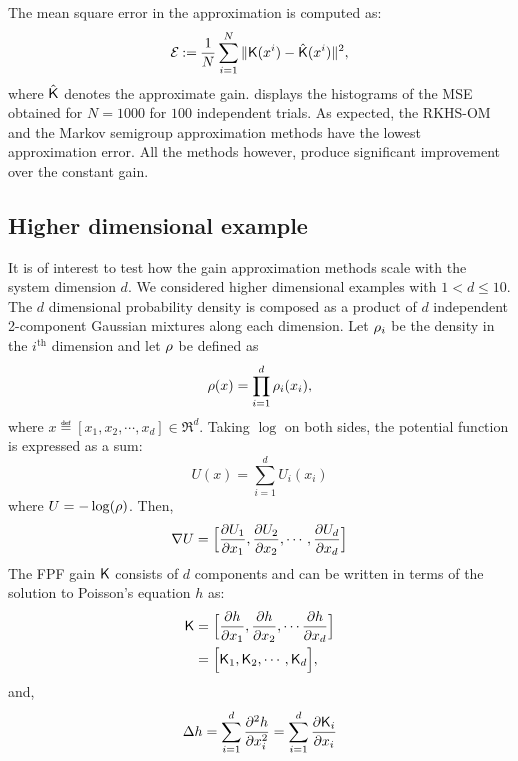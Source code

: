 The mean square error in the approximation is computed as:
\begin{equation}
\mathcal{E} \eqdef \frac{1}{N} \sum_{i=1}^N \|\kFPF(x^i)  - \hat{\kFPF}(x^i) \|^2,
\label{e:gain_mse}
\end{equation}
where $\hat{\text{\sf K}}$ denotes the approximate gain.  displays the histograms of the MSE obtained for $N=1000$ for $100$ independent trials. As expected, the RKHS-OM and the Markov semigroup approximation methods have the lowest approximation error. All the methods however, produce significant improvement over the constant gain. 

\subsection*{Higher dimensional example}
It is of interest to test how the gain approximation methods scale with the system dimension $d$. We considered higher dimensional examples with $1<d \leq 10$.  
The $d$ dimensional probability density is composed as a product of $d$ independent 2-component Gaussian mixtures along each dimension. Let $\rho_i$ be the density in the $i^{\text{th}}$ dimension and let $\rho$ be defined as 
\begin{equation}
\rho(x) = \prod_{i=1}^d \rho_i(x_i),
\end{equation}
where $x \eqdef [x_1, x_2, \cdots, x_d] \in \Re^d$. 
Taking $\log$ on both sides, the potential function is expressed as a sum:
\begin{equation}
U(x) = \sum_{i=1}^d U_i(x_i)
\end{equation}
where $U = -\log(\rho)$.
Then,
\begin{equation}
\nabla U = \Bigl[ \frac{\partial U_1}{\partial x_1}, \frac{\partial U_2}{\partial x_2}, \cdots , \frac{\partial U_d}{\partial x_d} \Bigr]
\end{equation}
The FPF gain $\text{\sf K}$ consists of $d$ components and can be written in terms of the solution to Poisson's equation $h$ as: 
\begin{equation}
\begin{aligned}
\text{\sf K} &= \Bigl[\frac{\partial h}{\partial x_1}, \frac{\partial h}{\partial x_2}, \cdots \frac{\partial h}{\partial x_d}\Bigr] \\
& = \Bigl[ \text{\sf K}_1, \text{\sf K}_2, \cdots, \text{\sf K}_d\Bigr],
\end{aligned}
\end{equation}
and, 
\begin{equation}
\Delta h = \sum_{i=1}^d \frac{\partial^2 h}{\partial x^2_i} = \sum_{i=1}^d \frac{\partial \text{\sf K}_i}{\partial x_i}
\end{equation}
